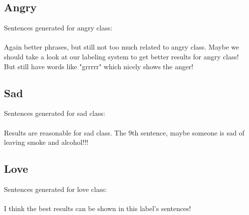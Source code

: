 \documentclass[a4paper]{article}
\begin{document}
\subsection{Angry}
Sentences generated for angry class:\\
\\
Again better phrases, but still not too much related to angry class. Maybe we should take a look at our labeling system to get better results for angry class! But still have words like "grrrrr" which nicely shows the anger!

\subsection{Sad}
Sentences generated for sad class:\\
\\
Results are reasonable for sad class. The 9th sentence, maybe someone is sad of leaving smoke and alcohol!!! 

\subsection{Love}
Sentences generated for love class:\\
\\
I think the best results can be shown in this label's sentences!
 
\pagebreak


\end{document}
